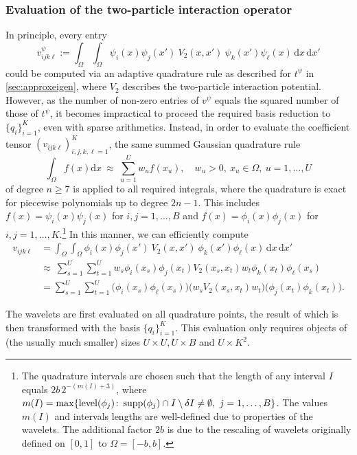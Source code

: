 \documentclass[a4paper,11pt,oneside]{amsart}
\newcommand\supp{\mathop{\rm supp}}
\theoremstyle{definition}
\theoremstyle{remark}
\newcommand{\sdd}{\,\mathrm{d}}
\numberwithin{equation}{section}
\numberwithin{theorem}{section}
\begin{document}
\subsubsection{Evaluation of the two-particle interaction operator}\label{sec:evaltwopart}
In principle, every entry
\begin{equation*}
  v_{ijk\ell}^\psi := \int_\Omega \int_\Omega \psi_i(x) \psi_j(x') \ V_2(x,x') \ \psi_k(x') \psi_\ell(x) \sdd x \sdd x' 
\end{equation*}
could be computed via an adaptive quadrature rule as described for $t^\psi$ in \cref{sec:approxeigen}, where $V_2$ describes the two-particle interaction potential. However, as the number of non-zero entries of $v^\psi$ equals the squared number of those of $t^\psi$, it becomes impractical to proceed the required basis reduction to $\{q_i\}_{i = 1}^K$, even with sparse arithmetics. Instead, in order to evaluate the coefficient tensor $(v_{ijk\ell})_{i,j,k,\ell = 1}^K$, the same summed Gaussian quadrature rule 
$$\int_{\Omega} f(x) \mathrm{d}x\ \approx\ \sum_{u = 1}^U w_u f(x_u), \quad w_u > 0,\ x_u \in \Omega,\ u = 1,\ldots,U$$ of degree $n \geq 7$ is applied to all required integrals, where the quadrature is exact for piecewise polynomials up to degree $2n-1$. This includes $f(x) = \psi_i(x) \psi_j(x)$ for $i,j = 1,\ldots,B$ and $f(x) = \phi_i(x) \phi_j(x)$ for $i,j = 1,\ldots,K$.\footnote{The quadrature intervals are chosen such that the length of any interval $I$ equals $2b\, 2^{-(m(I)+3)}$, where
 $m(I) = \max \{ \mathrm{level}(\phi_j) \colon \supp(\phi_j) \cap I \setminus \delta I \neq \emptyset, \ j = 1,\ldots,B \}$. The values $m(I)$ and intervals lengths are well-defined due to properties of the wavelets. The additional factor $2b$ is due to the rescaling of wavelets originally defined on $[0,1]$ to $\Omega = [-b,b]$.}
In this manner, we can efficiently compute
\begin{align*}
 v_{ijk\ell} & = \int_\Omega \int_\Omega \phi_i(x) \phi_j(x') \ V_2(x,x') \ \phi_k(x') \phi_\ell(x) \sdd x \sdd x' \\
 & \approx\ \sum_{s = 1}^U \sum_{t = 1}^U w_s \phi_i(x_s) \phi_j(x_t) V_2(x_s,x_t) w_t \phi_k(x_t) \phi_\ell(x_s) \\
%
 &  =  \sum_{s = 1}^U \sum_{t = 1}^U \big( \phi_i(x_s) \phi_\ell(x_s) \big)
  \big( w_s V_2(x_s,x_t) w_t \big) \big( \phi_j(x_t) \phi_k(x_t) \big). 
  \end{align*}

The wavelets are first evaluated on all quadrature points, the result of which is then transformed with the basis $\{q_i\}_{i = 1}^K$. This evaluation only requires objects of (the usually much smaller) sizes $U \times U, U \times B$ and $U \times K^2$.
\end{document}
